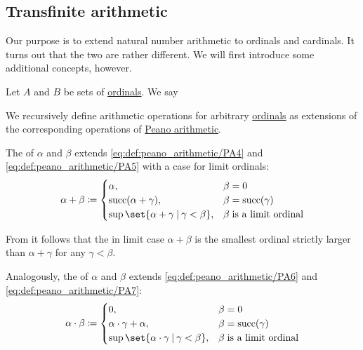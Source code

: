 \subsection{Transfinite arithmetic}\label{subsec:transfinite_arithmetic}

Our purpose is to extend natural number arithmetic to ordinals and cardinals. It turns out that the two are rather different. We will first introduce some additional concepts, however.

\begin{definition}
  Let \( A \) and \( B \) be sets of \hyperref[def:ordinal]{ordinals}. We say
\end{definition}

\begin{definition}\label{def:ordinal_arithmetic}
  We recursively define arithmetic operations for arbitrary \hyperref[def:ordinal]{ordinals} as extensions of the corresponding operations of \hyperref[def:peano_arithmetic]{Peano arithmetic}.

  \begin{thmenum}
     The  of \( \alpha \) and \( \beta \) extends \eqref{eq:def:peano_arithmetic/PA4} and \eqref{eq:def:peano_arithmetic/PA5} with a case for limit ordinals:
    \begin{equation}\label{eq:def:ordinal_arithmetic/addition}
      \alpha + \beta \coloneqq \begin{cases}
        \alpha,                                            &\beta = 0 \\
        \op{succ}(\alpha + \gamma),                        &\beta = \op{succ}(\gamma) \\
        \sup\set{ \alpha + \gamma \given \gamma < \beta }, &\beta \T{is a limit ordinal} \\
      \end{cases}
    \end{equation}

    From  it follows that the in limit case \( \alpha + \beta \) is the smallest ordinal strictly larger than \( \alpha + \gamma \) for any \( \gamma < \beta \).

     Analogously, the  of \( \alpha \) and \( \beta \) extends \eqref{eq:def:peano_arithmetic/PA6} and \eqref{eq:def:peano_arithmetic/PA7}:
    \begin{equation}\label{eq:def:ordinal_arithmetic/multiplication}
      \alpha \cdot \beta \coloneqq \begin{cases}
        0,                                                     &\beta = 0 \\
        \alpha \cdot \gamma + \alpha,                          &\beta = \op{succ}(\gamma) \\
        \sup\set{ \alpha \cdot \gamma \given \gamma < \beta }, &\beta \T{is a limit ordinal} \\
      \end{cases}
    \end{equation}


\end{thmenum}
\end{definition}
